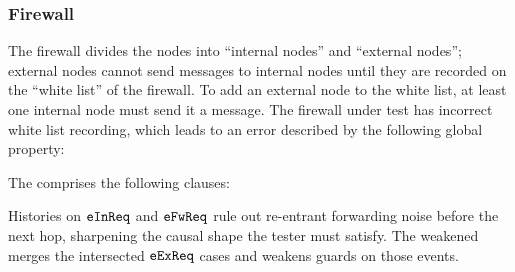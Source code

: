 \newpage
\subsubsection*{Firewall} The firewall divides the nodes into ``internal nodes'' and ``external nodes''; external nodes cannot send messages to internal nodes until they are recorded on the ``white list'' of the firewall. To add an external node to the white list, at least one internal node must send it a message. The firewall under test has incorrect white list recording, which leads to an error described by the following global property:
\vspace{-.35cm}\par{}
\vspace{-.4cm}\par\nobreak\noindent
The \tyName{} comprises the following clauses:
\vspace{-.35cm}\par{}
\vspace{-.4cm}\par\nobreak\noindent
Histories on \(\boldsymbol{{\tt eInReq}}\) and \(\boldsymbol{{\tt eFwReq}}\) rule out re-entrant forwarding noise before the next hop, sharpening the causal shape the tester must satisfy. The weakened \tyName{} merges the intersected \(\boldsymbol{{\tt eExReq}}\) cases and weakens guards on those events.

